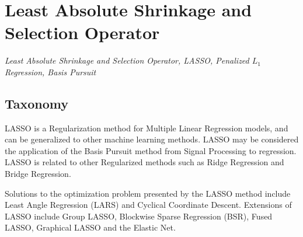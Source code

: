 
\section{Least Absolute Shrinkage and Selection Operator} 
\label{sec:lasso}

\emph{Least Absolute Shrinkage and Selection Operator, LASSO, Penalized $L_1$ Regression, Basis Pursuit}

\subsection{Taxonomy}
LASSO is a Regularization method for Multiple Linear Regression models, and can be generalized to other machine learning methods.
LASSO may be considered the application of the Basis Pursuit method from Signal Processing to regression.
LASSO is related to other Regularized methods such as Ridge Regression and Bridge Regression.

Solutions to the optimization problem presented by the LASSO method include Least Angle Regression (LARS) and Cyclical Coordinate Descent.
Extensions of LASSO include Group LASSO, Blockwise Sparse Regression (BSR), Fused LASSO, Graphical LASSO and the Elastic Net.

